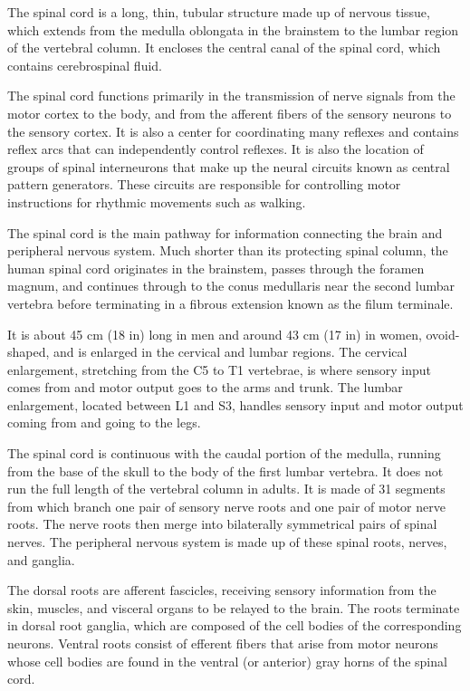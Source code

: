 \documentclass[]{book}
\begin{document}
The spinal cord is a long, thin, tubular structure made up of nervous tissue, which extends from the medulla oblongata in the brainstem to the lumbar region of the vertebral column. It encloses the central canal of the spinal cord, which contains cerebrospinal fluid.

The spinal cord functions primarily in the transmission of nerve signals from the motor cortex to the body, and from the afferent fibers of the sensory neurons to the sensory cortex. It is also a center for coordinating many reflexes and contains reflex arcs that can independently control reflexes. It is also the location of groups of spinal interneurons that make up the neural circuits known as central pattern generators. These circuits are responsible for controlling motor instructions for rhythmic movements such as walking.

The spinal cord is the main pathway for information connecting the brain and peripheral nervous system. Much shorter than its protecting spinal column, the human spinal cord originates in the brainstem, passes through the foramen magnum, and continues through to the conus medullaris near the second lumbar vertebra before terminating in a fibrous extension known as the filum terminale.

It is about 45 cm (18 in) long in men and around 43 cm (17 in) in women, ovoid-shaped, and is enlarged in the cervical and lumbar regions. The cervical enlargement, stretching from the C5 to T1 vertebrae, is where sensory input comes from and motor output goes to the arms and trunk. The lumbar enlargement, located between L1 and S3, handles sensory input and motor output coming from and going to the legs.

The spinal cord is continuous with the caudal portion of the medulla, running from the base of the skull to the body of the first lumbar vertebra. It does not run the full length of the vertebral column in adults. It is made of 31 segments from which branch one pair of sensory nerve roots and one pair of motor nerve roots. The nerve roots then merge into bilaterally symmetrical pairs of spinal nerves. The peripheral nervous system is made up of these spinal roots, nerves, and ganglia.

The dorsal roots are afferent fascicles, receiving sensory information from the skin, muscles, and visceral organs to be relayed to the brain. The roots terminate in dorsal root ganglia, which are composed of the cell bodies of the corresponding neurons. Ventral roots consist of efferent fibers that arise from motor neurons whose cell bodies are found in the ventral (or anterior) gray horns of the spinal cord.
\end{document}
